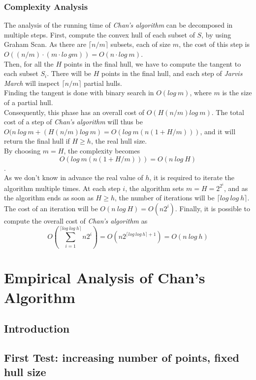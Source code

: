 \documentclass[
12pt,
a4paper,
oneside,
headinclude,
footinclude]{report}
\theoremstyle{definition} %
\begin{document}
\subsection{Complexity Analysis}
The analysis of the running time of \textit{Chan's algorithm} can be decomposed in multiple steps.
First, compute the convex hull of each subset of $S$, by using Graham Scan. As there are $\lceil n/m \rceil$ subsets, each of size $m$, the cost of this step is 
$O((n/m) \cdot (m\cdot lo\ gm)) = O(n \cdot log\ m)$.\\
Then, for all the $H$ points in the final hull, we have to compute the tangent to each subset $S_i$. There will be $H$ points in the final hull, and each step of \textit{Jarvis March} will inspect $\lceil n/m \rceil$ partial hulls.\\
Finding the tangent is done with binary search in $O(log\ m)$, where $m$ is the size of a partial hull.\\
Consequently, this phase has an overall cost of $O(H(n/m)log\ m)$.
The total cost of a step of \textit{Chan's algorithm} will thus be $O(n\ log\ m + (H(n/m)log\ m) = O(log\ m(n(1 + H/m)))$, and it will return the final hull if $H \geq h$, the real hull size.\\
By choosing $m = H$, the complexity becomes 
$$ O(log\ m(n(1 + H/m))) = O(n\ log\ H)$$.\\
As we don't know in advance the real value of $h$, it is required to iterate the algorithm multiple times. At each step $i$, the algorithm sets $m = H = 2^{2^i}$, and as the algorithm ends as soon as $H \geq h$, the number of iterations will be $\lceil log\ log\ h\rceil$.\\
The cost of an iteration will be $O(n\ log\ H) = O(n2^i)$.
Finally, it is possible to compute the overall cost of \textit{Chan's algorithm} as
$$O\left(\sum_{i = 1}^{\lceil log\ log\ h\rceil}{n2^i}\right) = O(n2^{\lceil log\ log\ h\rceil + 1}) = O(n\ log\ h)$$




\chapter{Empirical Analysis of Chan's Algorithm}
\section{Introduction}
\lipsum[1]
\section{\textbf{First Test:} increasing number of points, fixed hull size}
\lipsum[1]
\end{document}
